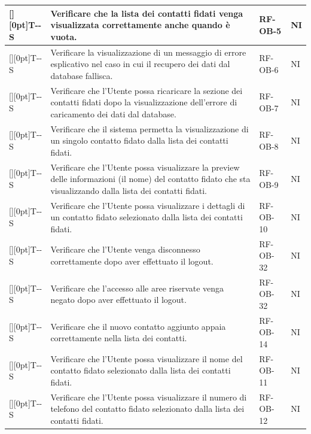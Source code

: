 \documentclass[a4paper,12pt]{article}
\newcounter{testsys}
\newcommand{\systestcode}{%
  \raisebox{0pt}[\height][0pt]{\hypertarget{T-\arabic{testsys}-S}{}}T-\arabic{testsys}-S%
}
\begin{document}
\begin{longtable}{| >{\centering\arraybackslash}p{} | >{\raggedright\arraybackslash}p{} | >{\centering\arraybackslash}p{} | >{\centering\arraybackslash}p{} |}
\stepcounter{testsys} \systestcode & Verificare che la lista dei contatti fidati venga visualizzata correttamente anche quando è vuota. & RF-OB-5 & NI \\
\hline

\stepcounter{testsys} \systestcode & Verificare la visualizzazione di un messaggio di errore esplicativo nel caso in cui il recupero dei dati dal database fallisca. & RF-OB-6 & NI \\
\hline

\stepcounter{testsys} \systestcode & Verificare che l'Utente possa ricaricare la sezione dei contatti fidati dopo la visualizzazione dell'errore di caricamento dei dati dal database. & RF-OB-7 & NI \\
\hline

\stepcounter{testsys} \systestcode & Verificare che il sistema permetta la visualizzazione di un singolo contatto fidato dalla lista dei contatti fidati. & RF-OB-8 & NI \\
\hline

\stepcounter{testsys} \systestcode & Verificare che l'Utente possa visualizzare la preview delle informazioni (il nome) del contatto fidato che sta visualizzando dalla lista dei contatti fidati. & RF-OB-9 & NI \\
\hline

\stepcounter{testsys} \systestcode & Verificare che l'Utente possa visualizzare i dettagli di un contatto fidato selezionato dalla lista dei contatti fidati. & RF-OB-10 & NI \\
\hline

\stepcounter{testsys} \systestcode & Verificare che l'Utente venga disconnesso correttamente dopo aver effettuato il logout. & RF-OB-32 & NI \\
\hline

\stepcounter{testsys} \systestcode & Verificare che l'accesso alle aree riservate venga negato dopo aver effettuato il logout. & RF-OB-32 & NI \\
\hline

\stepcounter{testsys} \systestcode & Verificare che il nuovo contatto aggiunto appaia correttamente nella lista dei contatti. & RF-OB-14 & NI \\
\hline

\stepcounter{testsys} \systestcode & Verificare che l'Utente possa visualizzare il nome del contatto fidato selezionato dalla lista dei contatti fidati. & RF-OB-11 & NI \\
\hline

\stepcounter{testsys} \systestcode & Verificare che l'Utente possa visualizzare il numero di telefono del contatto fidato selezionato dalla lista dei contatti fidati. & RF-OB-12 & NI \\
\hline


\end{longtable}
\end{document}
